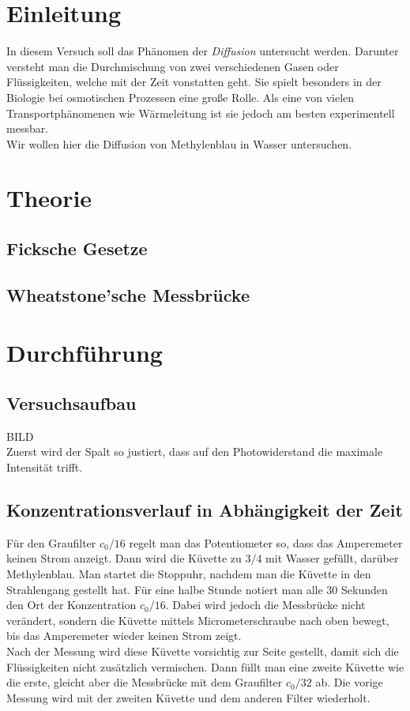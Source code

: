 \documentclass[12pt,a4paper,titlepage,headinclude,bibtotoc]{scrartcl}
\begin{document}
\tableofcontents

\newpage

\section{Einleitung}
\label{sec:einleitung}
In diesem Versuch soll das Phänomen der \textit{Diffusion} untersucht werden.
Darunter versteht man die Durchmischung von zwei verschiedenen Gasen oder Flüssigkeiten, welche mit der Zeit vonstatten geht.
Sie spielt besonders in der Biologie bei osmotischen Prozessen eine große Rolle.
Als eine von vielen Transportphänomenen wie Wärmeleitung ist sie jedoch am besten experimentell messbar.\\
Wir wollen hier die Diffusion von Methylenblau in Wasser untersuchen.

\section{Theorie}
\label{sec:theorie}
\subsection{Ficksche Gesetze}

\subsection{Wheatstone'sche Messbrücke}

\section{Durchführung}
\label{sec:durchfuehrung}
\subsection{Versuchsaufbau}
BILD\\
Zuerst wird der Spalt so justiert, dass auf den Photowiderstand die maximale Intensität trifft.
\subsection{Konzentrationsverlauf in Abhängigkeit der Zeit}
Für den Graufilter $c_0/16$ regelt man das Potentiometer so, dass das Amperemeter keinen Strom anzeigt.
Dann wird die Küvette zu $3/4$ mit Wasser gefüllt, darüber Methylenblau.
Man startet die Stoppuhr, nachdem man die Küvette in den Strahlengang gestellt hat.
Für eine halbe Stunde notiert man alle 30 Sekunden den Ort der Konzentration $c_0/16$.
Dabei wird jedoch die Messbrücke nicht verändert, sondern die Küvette mittels Micrometerschraube nach oben bewegt, bis das Amperemeter wieder keinen Strom zeigt.\\
Nach der Messung wird diese Küvette vorsichtig zur Seite gestellt, damit sich die Flüssigkeiten nicht zusätzlich vermischen.
Dann füllt man eine zweite Küvette wie die erste, gleicht aber die Messbrücke mit dem Graufilter $c_0/32$ ab.
Die vorige Messung wird mit der zweiten Küvette und dem anderen Filter wiederholt.
\end{document}
